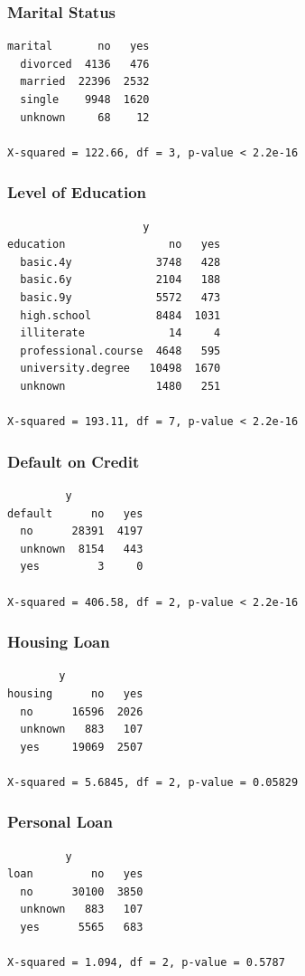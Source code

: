 \documentclass{beamer}
\begin{document}
\begin{frame}[fragile]
  \frametitle{Marital Status}
  \begin{verbatim}
marital       no   yes
  divorced  4136   476
  married  22396  2532
  single    9948  1620
  unknown     68    12

X-squared = 122.66, df = 3, p-value < 2.2e-16
  \end{verbatim}
\end{frame}

\begin{frame}[fragile]
  \frametitle{Level of Education}
  \begin{verbatim}
                     y
education                no   yes
  basic.4y             3748   428
  basic.6y             2104   188
  basic.9y             5572   473
  high.school          8484  1031
  illiterate             14     4
  professional.course  4648   595
  university.degree   10498  1670
  unknown              1480   251

X-squared = 193.11, df = 7, p-value < 2.2e-16
  \end{verbatim}
\end{frame}

\begin{frame}[fragile]
  \frametitle{Default on Credit}
  \begin{verbatim}
         y
default      no   yes
  no      28391  4197
  unknown  8154   443
  yes         3     0

X-squared = 406.58, df = 2, p-value < 2.2e-16
  \end{verbatim}
\end{frame}

\begin{frame}[fragile]
  \frametitle{Housing Loan}
  \begin{verbatim}
        y
housing      no   yes
  no      16596  2026
  unknown   883   107
  yes     19069  2507

X-squared = 5.6845, df = 2, p-value = 0.05829
  \end{verbatim}
\end{frame}

\begin{frame}[fragile]
  \frametitle{Personal Loan}
  \begin{verbatim}
         y
loan         no   yes
  no      30100  3850
  unknown   883   107
  yes      5565   683

X-squared = 1.094, df = 2, p-value = 0.5787
  \end{verbatim}
\end{frame}
\end{document}
